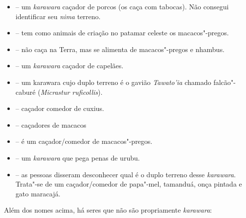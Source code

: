 \begin{itemize}
\item
  \emph{} -- um \emph{karawara} caçador de porcos
  (os caça com tabocas). Não consegui identificar seu \emph{nima}
  terreno.
 \item
  \emph{} -- tem como animais de criação no patamar
  celeste os macacos"-pregos.
  \item
  \emph{} -- não caça na Terra, mas se alimenta de
  macacos"-pregos e nhambus.
  \item
   -- um \emph{karawara} caçador de
  capelães.
 \item
   -- um karawara cujo duplo terreno
  é o gavião \emph{Tawato'ia} chamado falcão"-caburé (\emph{Micrastur
  ruficollis}).
  \item
  \emph{} -- caçador comedor de cuxius.
  \item
   -- caçadores de macacos 
  \item
   -- é um caçador/comedor de
  macacos"-pregos.
  \item
  \emph{} -- um \emph{karawara} que pega penas de
  urubu.
  \item
  \emph{} -- as pessoas disseram desconhecer qual é o
  duplo terreno desse \emph{karawara}. Trata"-se de um caçador/comedor de
  papa"-mel, tamanduá, onça pintada e gato maracajá.
  \end{itemize}

Além dos nomes acima, há seres que não são propriamente \emph{karawara}:

